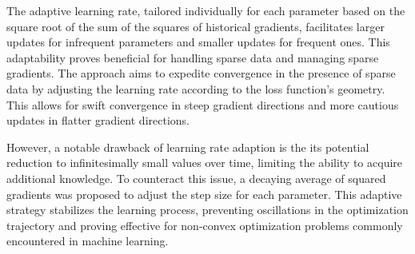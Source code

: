 The adaptive learning rate, tailored individually for each parameter based on the square root of the sum of the squares of historical gradients, facilitates larger updates for infrequent parameters and smaller updates for frequent ones. This adaptability proves beneficial for handling sparse data and managing sparse gradients. The approach aims to expedite convergence in the presence of sparse data by adjusting the learning rate according to the loss function's geometry. This allows for swift convergence in steep gradient directions and more cautious updates in flatter gradient directions.

However, a notable drawback of learning rate adaption is the its potential reduction to infinitesimally small values over time, limiting the ability to acquire additional knowledge. To counteract this issue, a decaying average of squared gradients was proposed to adjust the step size for each parameter. This adaptive strategy stabilizes the learning process, preventing oscillations in the optimization trajectory and proving effective for non-convex optimization problems commonly encountered in machine learning.

